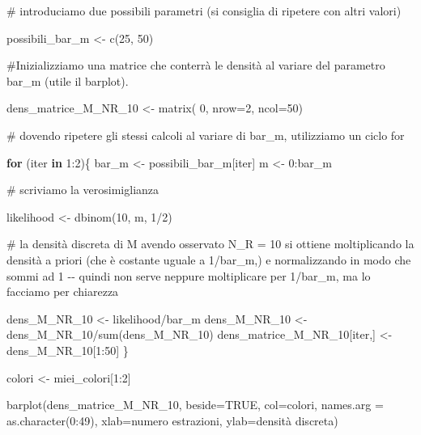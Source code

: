 \documentclass[
  italian,
  letterpaper,
]{book}
\newenvironment{Shaded}{\begin{snugshade}}{\end{snugshade}}
\newcommand{\AttributeTok}[1]{\textcolor[rgb]{0.40,0.45,0.13}{#1}}
\newcommand{\CommentTok}[1]{\textcolor[rgb]{0.37,0.37,0.37}{#1}}
\newcommand{\ConstantTok}[1]{\textcolor[rgb]{0.56,0.35,0.01}{#1}}
\newcommand{\ControlFlowTok}[1]{\textcolor[rgb]{0.00,0.23,0.31}{\textbf{#1}}}
\newcommand{\DecValTok}[1]{\textcolor[rgb]{0.68,0.00,0.00}{#1}}
\newcommand{\FunctionTok}[1]{\textcolor[rgb]{0.28,0.35,0.67}{#1}}
\newcommand{\NormalTok}[1]{\textcolor[rgb]{0.00,0.23,0.31}{#1}}
\newcommand{\OtherTok}[1]{\textcolor[rgb]{0.00,0.23,0.31}{#1}}
\newcommand{\SpecialCharTok}[1]{\textcolor[rgb]{0.37,0.37,0.37}{#1}}
\newcommand{\StringTok}[1]{\textcolor[rgb]{0.13,0.47,0.30}{#1}}
\theoremstyle{definition}
\theoremstyle{remark}
\begin{document}
\begin{Shaded}
\begin{Highlighting}[]
\CommentTok{\# introduciamo due possibili parametri (si consiglia di ripetere con altri valori)}

\NormalTok{possibili\_bar\_m }\OtherTok{\textless{}{-}} \FunctionTok{c}\NormalTok{(}\DecValTok{25}\NormalTok{, }\DecValTok{50}\NormalTok{)}

\CommentTok{\#Inizializziamo  una matrice che conterrà le densità al variare del parametro bar\_m (utile il barplot).}

\NormalTok{dens\_matrice\_M\_NR\_10 }\OtherTok{\textless{}{-}} \FunctionTok{matrix}\NormalTok{( }\DecValTok{0}\NormalTok{, }\AttributeTok{nrow=}\DecValTok{2}\NormalTok{, }\AttributeTok{ncol=}\DecValTok{50}\NormalTok{)}


\CommentTok{\# dovendo ripetere gli stessi calcoli al variare  di bar\_m, utilizziamo un ciclo for}

\ControlFlowTok{for}\NormalTok{ (iter }\ControlFlowTok{in} \DecValTok{1}\SpecialCharTok{:}\DecValTok{2}\NormalTok{)\{}
\NormalTok{  bar\_m }\OtherTok{\textless{}{-}}\NormalTok{ possibili\_bar\_m[iter]}
\NormalTok{  m }\OtherTok{\textless{}{-}} \DecValTok{0}\SpecialCharTok{:}\NormalTok{bar\_m}

\CommentTok{\# scriviamo la verosimiglianza}

\NormalTok{  likelihood }\OtherTok{\textless{}{-}} \FunctionTok{dbinom}\NormalTok{(}\DecValTok{10}\NormalTok{, m, }\DecValTok{1}\SpecialCharTok{/}\DecValTok{2}\NormalTok{)}

\CommentTok{\# la densità discreta di M avendo osservato N\_R = 10 si ottiene moltiplicando la densità a priori (che è costante uguale a 1/bar\_m,) e normalizzando in modo che sommi ad 1 {-}{-} quindi  non serve neppure moltiplicare per 1/bar\_m, ma lo facciamo per chiarezza}

\NormalTok{  dens\_M\_NR\_10 }\OtherTok{\textless{}{-}}\NormalTok{ likelihood}\SpecialCharTok{/}\NormalTok{bar\_m}
\NormalTok{  dens\_M\_NR\_10 }\OtherTok{\textless{}{-}}\NormalTok{ dens\_M\_NR\_10}\SpecialCharTok{/}\FunctionTok{sum}\NormalTok{(dens\_M\_NR\_10)}
\NormalTok{  dens\_matrice\_M\_NR\_10[iter,] }\OtherTok{\textless{}{-}}\NormalTok{ dens\_M\_NR\_10[}\DecValTok{1}\SpecialCharTok{:}\DecValTok{50}\NormalTok{]}
\NormalTok{\}}

\NormalTok{colori }\OtherTok{\textless{}{-}}\NormalTok{ miei\_colori[}\DecValTok{1}\SpecialCharTok{:}\DecValTok{2}\NormalTok{]}

\FunctionTok{barplot}\NormalTok{(dens\_matrice\_M\_NR\_10, }\AttributeTok{beside=}\ConstantTok{TRUE}\NormalTok{, }\AttributeTok{col=}\NormalTok{colori, }\AttributeTok{names.arg =} \FunctionTok{as.character}\NormalTok{(}\DecValTok{0}\SpecialCharTok{:}\DecValTok{49}\NormalTok{), }\AttributeTok{xlab=}\StringTok{\textquotesingle{}numero estrazioni\textquotesingle{}}\NormalTok{, }\AttributeTok{ylab=}\StringTok{\textquotesingle{}densità discreta\textquotesingle{}}\NormalTok{)}



\end{Highlighting}
\end{Shaded}
\end{document}
